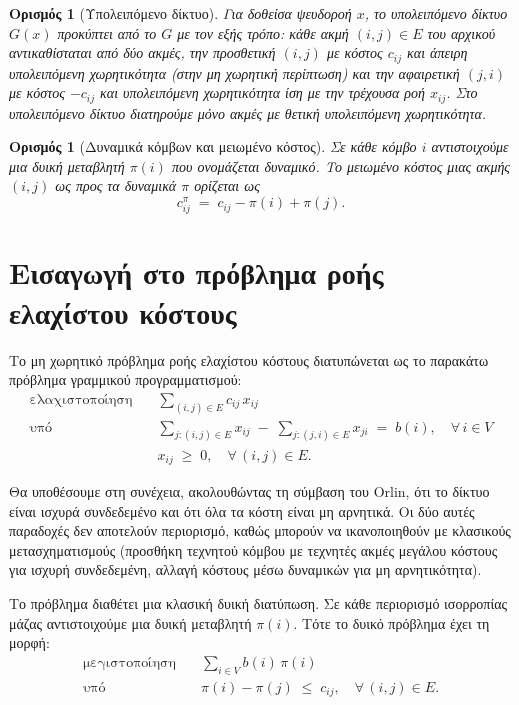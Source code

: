 \documentclass[11pt,a4paper,oneside]{report}
\newtheorem{definition}[theorem]{Ορισμός}
\begin{document}
\begin{definition}[Υπολειπόμενο δίκτυο]
Για δοθείσα ψευδοροή $x$, το υπολειπόμενο δίκτυο $G(x)$ προκύπτει από το $G$ με τον εξής τρόπο: κάθε ακμή $(i,j) \in E$ του αρχικού αντικαθίσταται από δύο ακμές, την \emph{προσθετική} $(i,j)$ με κόστος $c_{ij}$ και άπειρη υπολειπόμενη χωρητικότητα (στην μη χωρητική περίπτωση) και την \emph{αφαιρετική} $(j,i)$ με κόστος $-c_{ij}$ και υπολειπόμενη χωρητικότητα ίση με την τρέχουσα ροή $x_{ij}$. Στο υπολειπόμενο δίκτυο διατηρούμε μόνο ακμές με θετική υπολειπόμενη χωρητικότητα.
\end{definition}

\begin{definition}[Δυναμικά κόμβων και μειωμένο κόστος]
Σε κάθε κόμβο $i$ αντιστοιχούμε μια δυική μεταβλητή $\pi(i)$ που ονομάζεται \emph{δυναμικό}. Το \emph{μειωμένο κόστος} μιας ακμής $(i,j)$ ως προς τα δυναμικά $\pi$ ορίζεται ως
\[
c^{\pi}_{ij} \;=\; c_{ij} - \pi(i) + \pi(j).
\]
\end{definition}

\section{Εισαγωγή στο πρόβλημα ροής ελαχίστου κόστους}

Το μη χωρητικό πρόβλημα ροής ελαχίστου κόστους διατυπώνεται ως το παρακάτω πρόβλημα γραμμικού προγραμματισμού:
\begin{align*}
\text{ελαχιστοποίηση}\quad & \sum_{(i,j)\in E} c_{ij}\, x_{ij} \\
\text{υπό}\quad & \sum_{j:(i,j)\in E} x_{ij} \;-\; \sum_{j:(j,i)\in E} x_{ji} \;=\; b(i), \quad \forall\, i \in V \\
& x_{ij} \;\geq\; 0, \quad \forall\, (i,j) \in E.
\end{align*}

Θα υποθέσουμε στη συνέχεια, ακολουθώντας τη σύμβαση του \textenglish{Orlin}, ότι το δίκτυο είναι ισχυρά συνδεδεμένο και ότι όλα τα κόστη είναι μη αρνητικά. Οι δύο αυτές παραδοχές δεν αποτελούν περιορισμό, καθώς μπορούν να ικανοποιηθούν με κλασικούς μετασχηματισμούς (προσθήκη τεχνητού κόμβου με τεχνητές ακμές μεγάλου κόστους για ισχυρή συνδεδεμένη, αλλαγή κόστους μέσω δυναμικών για μη αρνητικότητα).

Το πρόβλημα διαθέτει μια κλασική δυική διατύπωση. Σε κάθε περιορισμό ισορροπίας μάζας αντιστοιχούμε μια δυική μεταβλητή $\pi(i)$. Τότε το δυικό πρόβλημα έχει τη μορφή:
\begin{align*}
\text{μεγιστοποίηση}\quad & \sum_{i\in V} b(i)\, \pi(i) \\
\text{υπό}\quad & \pi(i) - \pi(j) \;\leq\; c_{ij}, \quad \forall\, (i,j) \in E.
\end{align*}
\end{document}

